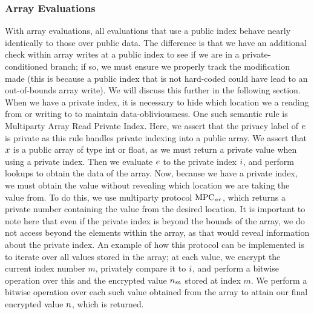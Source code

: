 \subsubsection{Array Evaluations} \label{subsec: picco arr eval}
With array evaluations, all evaluations that use a public index behave nearly identically to those over public data. 
The difference is that we have an additional check within array writes at a public index to see if we are in a private-conditioned branch; if so, we must ensure we properly track the modification made (this is because a public index that is not hard-coded could have lead to an out-of-bounds array write). 
We will discuss this further in the following section. 
When we have a private index, it is necessary to hide which location we a reading from or writing to to maintain data-obliviousness. One such semantic rule is Multiparty Array Read Private Index.
% 
Here, we assert that the privacy label of $e$ is private as this rule handles private indexing into a public array. 
We assert that $x$ is a public array of type int or float, as we must return a private value when using a private index. 
Then we evaluate $e$ to the private index $i$, and perform lookups to obtain the data of the array. 
Now, because we have a private index, we must obtain the value without revealing which location we are taking the value from. 
To do this, we use multiparty protocol $\mathrm{MPC}_\mathit{{ar}}$, which returns a private number containing the value from the desired location.  
It is important to note here that even if the private index is beyond the bounds of the array, we do not access beyond the elements within the array, as that would reveal information about the private index. 
An example of how this protocol can be implemented is to iterate over all values stored in the array; at each value, we encrypt the current index number $m$, privately compare it to $i$, and perform a bitwise  operation over this and the encrypted value $n_m$ stored at index $m$. We perform a bitwise  operation over each such value obtained from the array to attain our final encrypted value $n$, which is returned. 
%






































